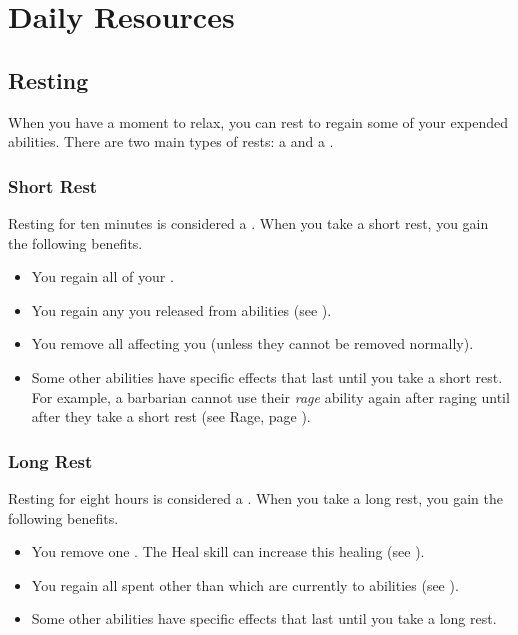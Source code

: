 \section{Daily Resources}

    \subsection{Resting}\label{Resting}
        When you have a moment to relax, you can rest to regain some of your expended abilities.
        There are two main types of rests: a  and a .

        \subsubsection{Short Rest}\label{Short Rest}
            Resting for ten minutes is considered a .
            When you take a short rest, you gain the following benefits.
            \begin{itemize}
                \item You regain all of your .
                \item You regain any  you released from  abilities (see ).
                \item You remove all  affecting you (unless they cannot be removed normally).
                \item Some other abilities have specific effects that last until you take a short rest.
                    For example, a barbarian cannot use their \textit{rage} ability again after raging until after they take a short rest (see Rage, page ).
            \end{itemize}

        \subsubsection{Long Rest}\label{Long Rest}
            Resting for eight hours is considered a .
            When you take a long rest, you gain the following benefits.
            \begin{itemize}
                \item You remove one .
                    The Heal skill can increase this healing (see ).
                \item You regain all spent  other than  which are currently  to abilities (see ).
                \item Some other abilities have specific effects that last until you take a long rest.
            \end{itemize}

